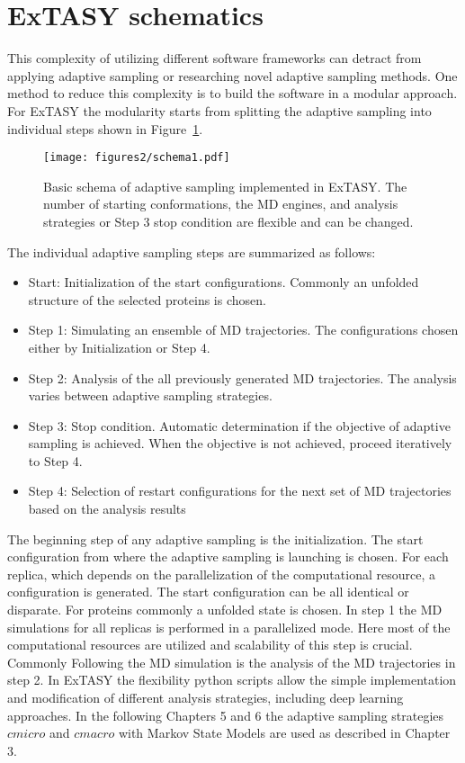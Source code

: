 {\section{\label{sec:design}ExTASY schematics}
This complexity of utilizing different software frameworks can detract from applying adaptive sampling or researching novel adaptive sampling methods. One method to reduce this complexity is to build the software in a modular approach. For ExTASY the modularity starts from splitting the adaptive sampling into individual steps shown in Figure~\ref{fig:schema2}.

\begin{figure}[h]
  \centering
  \texttt{[image: figures2/schema1.pdf]}
  \caption{Basic schema of adaptive sampling implemented in ExTASY. The
  number of starting conformations, the MD engines, and analysis strategies or Step 3 stop condition are flexible and can be changed. }
  \label{fig:schema2}
\end{figure}

The individual adaptive sampling steps are summarized as follows:
\begin{itemize}
\item Start: Initialization of the start configurations.  Commonly an unfolded structure of the selected proteins is chosen.
\item Step 1: Simulating an ensemble of MD trajectories. The configurations chosen either by Initialization or Step 4. 
\item Step 2: Analysis of the all previously generated MD trajectories. The analysis varies between adaptive sampling strategies.
\item Step 3: Stop condition. Automatic determination if the objective of adaptive sampling is achieved. When the objective is not achieved, proceed iteratively to Step 4. 
\item Step 4: Selection of restart configurations for the next set of MD trajectories based on the analysis results 
\end{itemize}

The beginning step of any adaptive sampling is the initialization. The start configuration from where the adaptive sampling is launching is chosen. For each replica, which depends on the parallelization of the computational resource, a configuration is generated. The start configuration can be all identical or disparate. For proteins commonly a unfolded state is chosen.
In step 1 the MD simulations for all replicas is performed in a parallelized mode. Here most of the computational resources are utilized and scalability of this step is crucial. Commonly  
Following the MD simulation is the analysis of the MD trajectories in step 2. In ExTASY the flexibility python scripts allow the simple implementation and modification of different analysis strategies, including deep learning approaches\cite{Mardt2018}. In the following Chapters 5 and 6 the adaptive sampling strategies $cmicro$ and $cmacro$ with Markov State Models \cite{prinz2011markov} are used as described in Chapter 3. 

}

